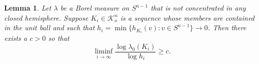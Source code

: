 \documentclass{cpamart1}     %
\newtheorem{lemm}[theo]{Lemma}
\theoremstyle{definition}
\theoremstyle{remark}
\newcommand{\sn}{S^{n-1}}
\begin{document}
\begin{lemm}\label{e2}
Let $\lambda$ be a Borel measure on $\sn$ that is not concentrated in any closed hemisphere.
Suppose $K_i\in \mathcal{K}_o^n$ is a sequence whose members are contained in the unit ball
and such that
$h_i=\min\{h_{K_i}(v):v\in S^{n-1}\}\rightarrow 0$. Then there exists a $c>0$ so that
\begin{equation*}
\liminf_{i\rightarrow\infty}\frac{\log\lambda_0(K_i)}{\log h_i}\geq c.
\end{equation*}
\end{lemm}
\end{document}
